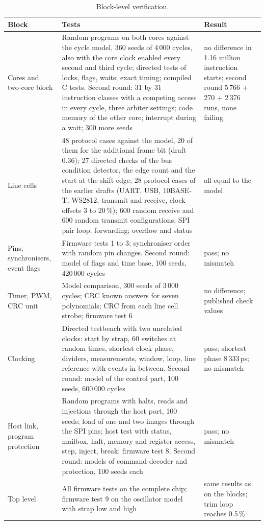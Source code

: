 \documentclass[10pt,a4paper]{article}
\begin{document}
\begin{table}[H]
\centering\small
\begin{tabularx}{\linewidth}{@{}lLL@{}}
\toprule
Block & Tests & Result \\
\midrule
Cores and two-core block & Random programs on both cores against the cycle model, 360 seeds of 4\,000 cycles, also with the core clock enabled every second and third cycle; directed tests of locks, flags, waits; exact timing; compiled C tests. Second round: 31 by 31 instruction classes with a competing access in every cycle, three arbiter settings; code memory of the other core; interrupt during a wait; 300 more seeds & no difference in 1.16 million instruction starts; second round 5\,766 + 270 + 2\,376 runs, none failing \\
Line cells & 48 protocol cases against the model, 20 of them for the additional frame bit (draft 0.36); 27 directed checks of the bus condition detector, the edge count and the start at the shift edge; 28 protocol cases of the earlier drafts (UART, USB, 10BASE-T, WS2812, transmit and receive, clock offsets 3 to 20\,\%); 600 random receive and 600 random transmit configurations; SPI pair loop; forwarding; overflow and status & all equal to the model \\
Pins, synchronisers, event flags & Firmware tests 1 to 3; synchroniser order with random pin changes. Second round: model of flags and time base, 100 seeds, 420\,000 cycles & pass; no mismatch \\
Timer, PWM, CRC unit & Model comparison, 300 seeds of 3\,000 cycles; CRC known answers for seven polynomials; CRC from each line cell strobe; firmware test 6 & no difference; published check values \\
Clocking & Directed testbench with two unrelated clocks: start by strap, 60 switches at random times, shortest clock phase, dividers, measurements, window, loop, line reference with events in between. Second round: model of the control part, 100 seeds, 600\,000 cycles & pass; shortest phase 8\,333\,ps; no mismatch \\
Host link, program protection & Random programs with halts, reads and injections through the host port, 100 seeds; load of one and two images through the SPI pins; host test with status, mailbox, halt, memory and register access, step, inject, break; firmware test 8. Second round: models of command decoder and protection, 100 seeds each & pass; no mismatch \\
Top level & All firmware tests on the complete chip; firmware test 9 on the oscillator model with strap low and high & same results as on the blocks; trim loop reaches 0.5\,\% \\
\bottomrule
\end{tabularx}
\caption{Block-level verification.}
\end{table}
\end{document}
